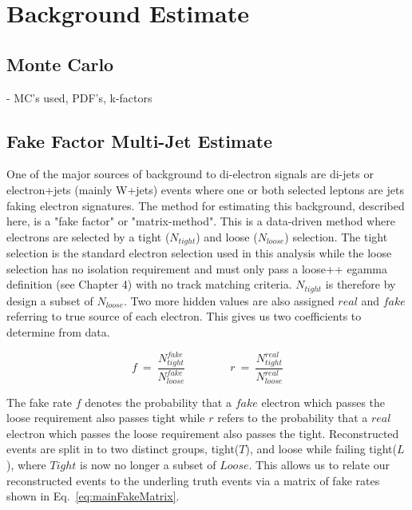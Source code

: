 \chapter{Background Estimate }

\section{Monte Carlo }
{\normalsize - MC's used, PDF's, k-factors}

\section{Fake Factor Multi-Jet Estimate }

One of the major sources of background to di-electron signals are di-jets or electron+jets (mainly W+jets) events where one or both selected leptons are jets faking electron signatures. The method for estimating this background, described here, is a "fake factor" or "matrix-method". This is a data-driven method where electrons are selected by a tight ($N_{tight}$) and loose ($N_{loose}$) selection. The tight selection is the standard electron selection used in this analysis while the loose selection has no isolation requirement and must only pass a loose++ egamma definition (see Chapter 4) with no track matching criteria. $N_{tight}$ is therefore by design a subset of $N_{loose}$. Two more hidden values are also assigned $real$ and $fake$ referring to true source of each electron. This gives us two coefficients to determine from data.

\begin{equation} \label{eq:fakeRate}
   f~=~\frac{N^{fake}_{tight}}{N^{fake}_{loose}} \qquad \qquad r~=~\frac{N^{real}_{tight}}{N^{real}_{loose}}
\end{equation}

The fake rate $f$ denotes the probability that a $fake$ electron which passes the loose requirement also passes tight while $r$ refers to the probability that a $real$ electron which passes the loose requirement also passes the tight.
Reconstructed events are split in to two distinct groups, tight($T$), and loose while failing tight($L$), where $Tight$ is now no longer a subset of $Loose$. This allows us to relate our reconstructed events to the underling truth events via a matrix of fake rates shown in Eq.~\ref{eq:mainFakeMatrix}.

